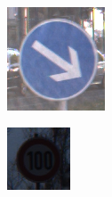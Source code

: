 \begin{figure}[H]
\begin{subfigure}[b]{0.125\textwidth}
       \includegraphics[height=\textwidth]{../images/GTSRB/00847.png}
       \caption{}
       \label{fig:gtrsb-paper-bsp-image-2}
   \end{subfigure}
   \hspace{3em}%
   \begin{subfigure}[b]{0.125\textwidth}
       \centering
       \includegraphics[height=\textwidth]{../images/GTSRB/00040.png}

\end{subfigure}
\end{figure}
